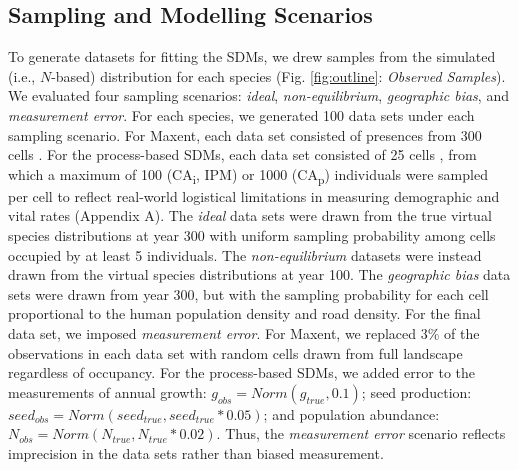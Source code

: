 \documentclass[preprint,review,times,12pt]{elsarticle}
\begin{document}
\subsection{Sampling and Modelling Scenarios}
To generate datasets for fitting the SDMs, we drew samples from the simulated (i.e., $N$-based) distribution for each species (Fig. \ref{fig:outline}: \emph{Observed Samples}). We evaluated four sampling scenarios: \emph{ideal}, \emph{non-equilibrium}, \emph{geographic bias}, and \emph{measurement error}. For each species, we generated 100 data sets under each sampling scenario. For Maxent, each data set consisted of presences from 300 cells \citep{Wisz2008,Allen2016,Fernandes2018}. For the process-based SDMs, each data set consisted of 25 cells \citep{Merow2017}, from which a maximum of 100 (CA\textsubscript{i}, IPM) or 1000 (CA\textsubscript{p}) individuals were sampled per cell to reflect real-world logistical limitations in measuring demographic and vital rates (Appendix A). The \emph{ideal} data sets were drawn from the true virtual species distributions at year 300 with uniform sampling probability among cells occupied by at least 5 individuals. The \emph{non-equilibrium} datasets were instead drawn from the virtual species distributions at year 100. The \emph{geographic bias} data sets were drawn from year 300, but with the sampling probability for each cell proportional to the human population density and road density. For the final data set, we imposed \emph{measurement error}. For Maxent, we replaced 3\% of the observations in each data set with random cells drawn from full landscape regardless of occupancy. For the process-based SDMs, we added error to the measurements of annual growth: $g_{obs} = Norm(g_{true}, 0.1)$; seed production: $seed_{obs} = Norm(seed_{true}, seed_{true}*0.05)$; and population abundance: $N_{obs} = Norm(N_{true}, N_{true}*0.02)$. Thus, the \emph{measurement error} scenario reflects imprecision in the data sets rather than biased measurement. 
\end{document}

